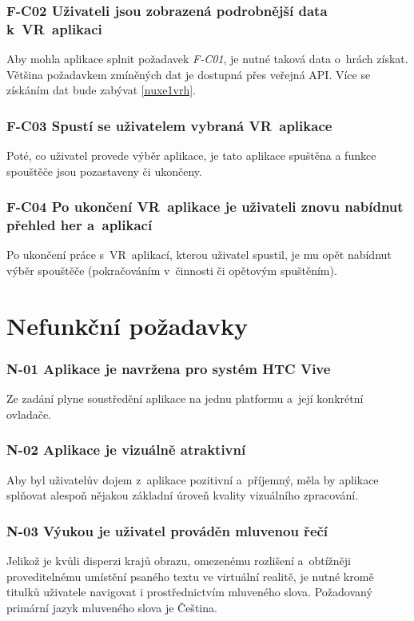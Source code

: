 \subsubsection*{F-C02 Uživateli jsou zobrazená podrobnější data k~VR~aplikaci}
Aby mohla aplikace splnit požadavek \emph{F-C01}, je nutné taková data
o~hrách získat. Většina požadavkem zmíněných dat je dostupná přes veřejná
API. Více se získáním dat bude zabývat \ref{nuxe1vrh}.

\subsubsection*{F-C03 Spustí se uživatelem vybraná VR~aplikace}
Poté, co uživatel provede výběr aplikace, je tato aplikace spuštěna a
funkce spouštěče jsou pozastaveny či ukončeny.

\subsubsection*{F-C04 Po ukončení VR~aplikace je uživateli znovu nabídnut
přehled her a~aplikací}
Po ukončení práce s~VR~aplikací, kterou uživatel spustil, je mu opět
nabídnut výběr spouštěče (pokračováním v~činnosti či opětovým
spuštěním).

\newpage

\section{Nefunkční požadavky}\label{nefunkux10dnuxed-poux17eadavky}

\subsubsection*{N-01 Aplikace je navržena pro systém HTC Vive}
Ze zadání plyne soustředění aplikace na jednu platformu a~její konkrétní
ovladače.

\subsubsection*{N-02 Aplikace je vizuálně atraktivní}
Aby byl uživatelův dojem z~aplikace pozitivní a~příjemný, měla by
aplikace splňovat alespoň nějakou základní úroveň kvality vizuálního
zpracování.

\subsubsection*{N-03 Výukou je uživatel prováděn mluvenou řečí}
Jelikož je kvůli disperzi krajů obrazu, omezenému rozlišení a~obtížněji
proveditelnému umístění psaného textu ve virtuální realitě, je nutné
kromě titulků uživatele navigovat i prostřednictvím mluveného slova.
Požadovaný primární jazyk mluveného slova je Čeština.


